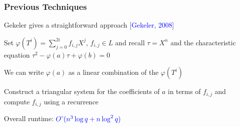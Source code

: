 \documentclass{beamer}
\newcommand{\blue}{\textcolor{blue}}
\newcommand{\spa}{\vspace{0.2cm}}
\newcommand{\spa}{\textnormal{ }}
\begin{document}





\begin{frame}
\frametitle{Previous Techniques}


     Gekeler gives a straightforward approach \blue{[Gekeler, 2008]}
     
     \spa
     
    Set $\varphi(T^i) = \sum_{j=0}^{2i}f_{i,j} X^j$, $f_{i,j} \in L$ and recall $\tau = X^n$ and the characteristic equation $\tau^2 - \varphi(a)\tau + \varphi(b) = 0$
    
    \spa
    
    We can write $\varphi(a)$ as a linear combination of the $\varphi(T^i)$
    
    \spa
    
     Construct a triangular system for the coefficients of $a$ in terms of $f_{i,j}$ and compute $f_{i,j}$ using a recurrence
     
     \spa
     Overall runtime: $\blue{O\tilde{~}(n^3 \log q + n\log^2 q)}$



\end{frame}








\end{document}
